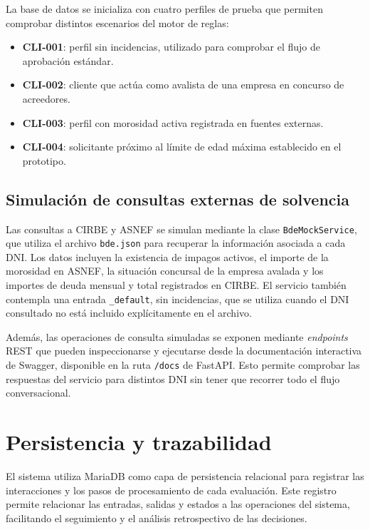 \documentclass[12pt,a4paper]{report}
\begin{document}
La base de datos se inicializa con cuatro perfiles de prueba que permiten comprobar distintos escenarios del motor de reglas:

\begin{itemize}
    \item \textbf{CLI-001}: perfil sin incidencias, utilizado para comprobar el flujo de aprobación estándar.
    \item \textbf{CLI-002}: cliente que actúa como avalista de una empresa en concurso de acreedores.
    \item \textbf{CLI-003}: perfil con morosidad activa registrada en fuentes externas.
    \item \textbf{CLI-004}: solicitante próximo al límite de edad máxima establecido en el prototipo.
\end{itemize}

\subsection{Simulación de consultas externas de solvencia}

Las consultas a CIRBE y ASNEF se simulan mediante la clase \texttt{BdeMockService}, que utiliza el archivo \texttt{bde.json} para recuperar la información asociada a cada DNI. Los datos incluyen la existencia de impagos activos, el importe de la morosidad en ASNEF, la situación concursal de la empresa avalada y los importes de deuda mensual y total registrados en CIRBE. El servicio también contempla una entrada \texttt{\_default}, sin incidencias, que se utiliza cuando el DNI consultado no está incluido explícitamente en el archivo.

Además, las operaciones de consulta simuladas se exponen mediante \textit{endpoints} REST que pueden inspeccionarse y ejecutarse desde la documentación interactiva de Swagger, disponible en la ruta \texttt{/docs} de FastAPI. Esto permite comprobar las respuestas del servicio para distintos DNI sin tener que recorrer todo el flujo conversacional.

\section{Persistencia y trazabilidad}

El sistema utiliza MariaDB como capa de persistencia relacional para registrar las interacciones y los pasos de procesamiento de cada evaluación. Este registro permite relacionar las entradas, salidas y estados a las operaciones del sistema, facilitando el seguimiento y el análisis retrospectivo de las decisiones.
\end{document}
